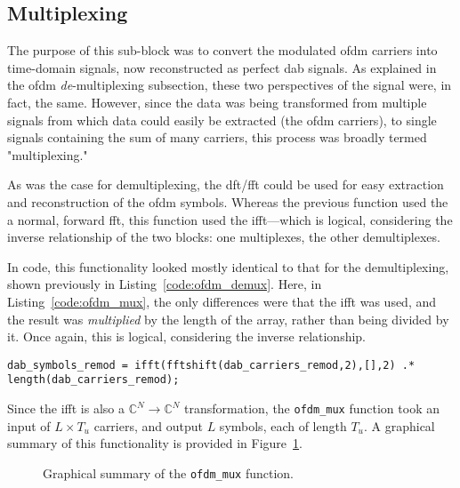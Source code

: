 \documentclass[class=report,11pt,crop=false]{standalone}
\begin{document}
\subsection{ Multiplexing \label{subsect:dab-proc_ofdm-mux}}
The purpose of this sub-block was to convert the modulated \gls{ofdm} carriers into time-domain signals, now reconstructed as perfect \gls{dab} signals. As explained in the \gls{ofdm} \emph{de}-multiplexing subsection, these two perspectives of the signal were, in fact, the same. However, since the data was being transformed from multiple signals from which data could easily be extracted (the \gls{ofdm} carriers), to single signals containing the sum of many carriers, this process was broadly termed "multiplexing."

As was the case for demultiplexing, the \gls{dft}/\gls{fft} could be used for easy extraction and reconstruction of the \gls{ofdm} symbols. Whereas the previous function used the a normal, forward \gls{fft}, this function used the \gls{ifft}---which is logical, considering the inverse relationship of the two blocks: one multiplexes, the other demultiplexes.

In code, this functionality looked mostly identical to that for the demultiplexing, shown previously in Listing~\ref{code:ofdm_demux}. Here, in Listing~\ref{code:ofdm_mux}, the only differences were that the \gls{ifft} was used, and the result was \emph{multiplied} by the length of the array, rather than being divided by it. Once again, this is logical, considering the inverse relationship.

\begin{lstlisting}[caption={\textsc{Matlab} code for multiplexing an \gls{ofdm} symbol}, label={code:ofdm_mux}]
dab_symbols_remod = ifft(fftshift(dab_carriers_remod,2),[],2) .* length(dab_carriers_remod);
\end{lstlisting}

Since the \gls{ifft} is also a \(\mathbb{C}^N \to \mathbb{C}^N\) transformation, the \texttt{ofdm\_mux} function took an input of \(L\times T_u\) carriers, and output \(L\) symbols, each of length \(T_u\). A graphical summary of this functionality is provided in Figure~\ref{fig:ofdm_mux}.

\begin{figure}[htbp]
  \centering
  \captionsetup{type=figure}
  \def\svgwidth{\linewidth}
  { %
  }
  \caption{Graphical summary of the \texttt{ofdm\_mux} function.}
  \label{fig:ofdm_mux}
\end{figure}
\end{document}
